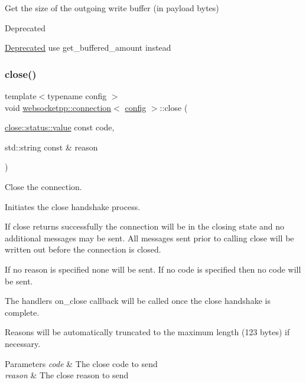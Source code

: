 Get the size of the outgoing write buffer (in payload bytes) 

\begin{DoxyRefDesc}{Deprecated}
\item[\mbox{\hyperlink{deprecated__deprecated000001}{Deprecated}}]use {\ttfamily get\+\_\+buffered\+\_\+amount} instead \end{DoxyRefDesc}
\mbox{\label{classwebsocketpp_1_1connection_ae718e4fa8b2c37757d8abd71dae07dc9}} 
\subsubsection{\texorpdfstring{close()}{close()}}
{\footnotesize\ttfamily template$<$typename config $>$ \\
void \mbox{\hyperlink{classwebsocketpp_1_1connection}{websocketpp\+::connection}}$<$ \mbox{\hyperlink{classconfig}{config}} $>$\+::close (\begin{DoxyParamCaption}\item[{\mbox{\hyperlink{namespacewebsocketpp_1_1close_1_1status_a8614a5c4733d708e2d2a32191c5bef84}{close\+::status\+::value}} const}]{code,  }\item[{std\+::string const \&}]{reason }\end{DoxyParamCaption})}



Close the connection. 

Initiates the close handshake process.

If close returns successfully the connection will be in the closing state and no additional messages may be sent. All messages sent prior to calling close will be written out before the connection is closed.

If no reason is specified none will be sent. If no code is specified then no code will be sent.

The handler\textquotesingle{}s on\+\_\+close callback will be called once the close handshake is complete.

Reasons will be automatically truncated to the maximum length (123 bytes) if necessary.


\begin{DoxyParams}{Parameters}
{\em code} & The close code to send \\
\hline
{\em reason} & The close reason to send \\
\hline
\end{DoxyParams}
\mbox{\label{classwebsocketpp_1_1connection_a32c3f964cef870faf0d8f23c5b7588bb}} 
